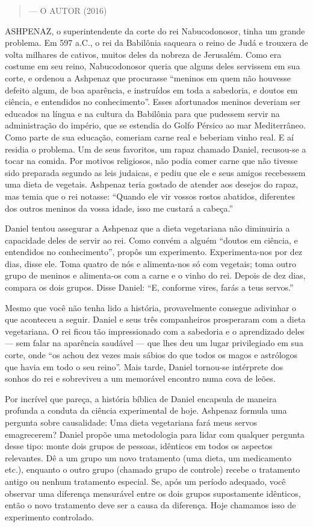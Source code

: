 \documentclass[11pt,a5paper,twoside]{book}
\begin{document}
\begin{quote}
— O AUTOR (2016)
\end{quote}
ASHPENAZ, o superintendente da corte do rei Nabucodonosor, tinha um grande problema. Em 597 a.C., o rei da Babilônia saqueara o reino de Judá e trouxera de volta milhares de cativos, muitos deles da nobreza de Jerusalém. Como era costume em seu reino, Nabucodonosor queria que alguns deles servissem em sua corte, e ordenou a Ashpenaz que procurasse “meninos em quem não houvesse defeito algum, de boa aparência, e instruídos em toda a sabedoria, e doutos em ciência, e entendidos no conhecimento”. Esses afortunados meninos deveriam ser educados na língua e na cultura da Babilônia para que pudessem servir na administração do império, que se estendia do Golfo Pérsico ao mar Mediterrâneo. Como parte de sua educação, comeriam carne real e beberiam vinho real. E aí residia o problema. Um de seus favoritos, um rapaz chamado Daniel, recusou-se a tocar na comida. Por motivos religiosos, não podia comer carne que não tivesse sido preparada segundo as leis judaicas, e pediu que ele e seus amigos recebessem uma dieta de vegetais. Ashpenaz teria gostado de atender aos desejos do rapaz, mas temia que o rei notasse: “Quando ele vir vossos rostos abatidos, diferentes dos outros meninos da vossa idade, isso me custará a cabeça.”

Daniel tentou assegurar a Ashpenaz que a dieta vegetariana não diminuiria a capacidade deles de servir ao rei. Como convém a alguém “doutos em ciência, e entendidos no conhecimento”, propôs um experimento. Experimenta-nos por dez dias, disse ele. Toma quatro de nós e alimenta-nos só com vegetais; toma outro grupo de meninos e alimenta-os com a carne e o vinho do rei. Depois de dez dias, compara os dois grupos. Disse Daniel: “E, conforme vires, farás a teus servos.”

Mesmo que você não tenha lido a história, provavelmente consegue adivinhar o que aconteceu a seguir. Daniel e seus três companheiros prosperaram com a dieta vegetariana. O rei ficou tão impressionado com a sabedoria e o aprendizado deles — sem falar na aparência saudável — que lhes deu um lugar privilegiado em sua corte, onde “os achou dez vezes mais sábios do que todos os magos e astrólogos que havia em todo o seu reino”. Mais tarde, Daniel tornou-se intérprete dos sonhos do rei e sobreviveu a um memorável encontro numa cova de leões.

Por incrível que pareça, a história bíblica de Daniel encapsula de maneira profunda a conduta da ciência experimental de hoje. Ashpenaz formula uma pergunta sobre causalidade: Uma dieta vegetariana fará meus servos emagrecerem? Daniel propõe uma metodologia para lidar com qualquer pergunta desse tipo: monte dois grupos de pessoas, idênticos em todos os aspectos relevantes. Dê a um grupo um novo tratamento (uma dieta, um medicamento etc.), enquanto o outro grupo (chamado grupo de controle) recebe o tratamento antigo ou nenhum tratamento especial. Se, após um período adequado, você observar uma diferença mensurável entre os dois grupos supostamente idênticos, então o novo tratamento deve ser a causa da diferença. Hoje chamamos isso de experimento controlado.
\end{document}
